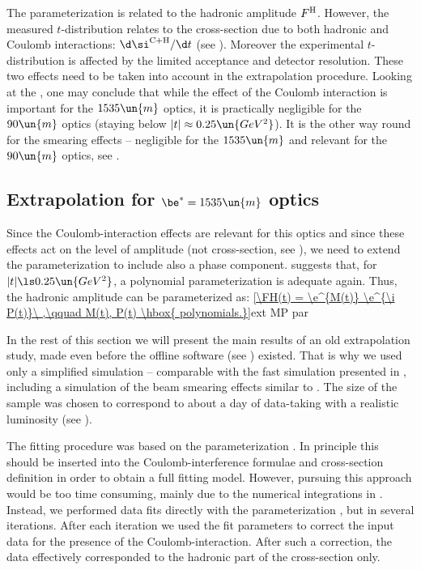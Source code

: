 The parameterization  is related to the hadronic amplitude $F^{\rm H}$. However, the measured $t$-distribution relates to the cross-section due to both hadronic and Coulomb interactions: $\d\si^{\rm C+H}/\d t$ (see ). Moreover the experimental $t$-distribution is affected by the limited acceptance and detector resolution. These two effects need to be taken into account in the extrapolation procedure. Looking at the , one may conclude that while the effect of the Coulomb interaction is important for the $1535\un{m}$ optics, it is practically negligible for the $90\un{m}$ optics (staying below $|t| \approx 0.25\un{GeV^2}$). It is the other way round for the smearing effects -- negligible for the $1535\un{m}$ and relevant for the $90\un{m}$ optics, see .

\def\OutlineLabel{Extrapolation for beta* = 1535 m optics}
\def\TOCLabel{Extrapolation for $\be^* = 1535$ m optics}
\subsection{Extrapolation for $\be^* = 1535\un{m}$ optics}

Since the Coulomb-interaction effects are relevant for this optics and since these effects act on the level of amplitude (not cross-section, see ), we need to extend the parameterization  to include also a phase component.  suggests that, for $|t| \ls 0.25\un{GeV^2}$, a polynomial parameterization is adequate again. Thus, the hadronic amplitude can be parameterized as:
\eqref{\FH(t) = \e^{M(t)} \e^{\i P(t)}\ ,\qquad M(t), P(t) \hbox{ polynomials.}}{ext MP par}

In the rest of this section we will present the main results of an old extrapolation study, made even before the  offline software (see ) existed. That is why we used only a simplified  simulation -- comparable with the fast simulation presented in , including a simulation of the beam smearing effects similar to . The size of the  sample was chosen to correspond to about a day of data-taking with a realistic luminosity (see ).

The fitting procedure was based on the parameterization . In principle this should be inserted into the Coulomb-interference formulae  and cross-section definition  in order to obtain a full fitting model. However, pursuing this approach would be too time consuming, mainly due to the numerical integrations in . Instead, we performed data fits directly with the parameterization , but in several iterations. After each iteration we used the fit parameters to correct the input data for the presence of the Coulomb-interaction. After such a correction, the data effectively corresponded to the hadronic part of the cross-section only.

